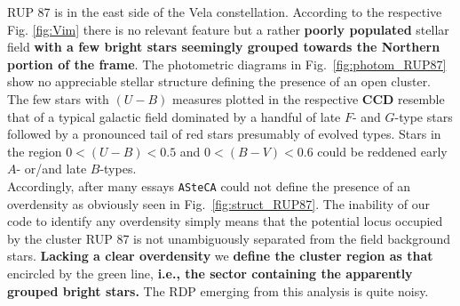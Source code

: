 \documentclass[referee]{aa}
\begin{document}
RUP 87 is in the east side of the Vela constellation. According to the
respective Fig. \ref{fig:Vim} there is no relevant feature but a rather
\textbf{poorly populated} stellar field \textbf{with a few bright stars
seemingly grouped  towards the Northern portion of the frame}.
The photometric diagrams in Fig.~\ref{fig:photom_RUP87} show no appreciable
stellar structure defining the presence of an open cluster.
The few stars with $(U-B)$ measures plotted in the respective \textbf{CCD}
resemble that of a typical galactic field dominated by a handful of late $F$-
and $G$-type stars followed by a pronounced tail of red stars presumably of
evolved types. Stars in the region $0<(U-B)<0.5$ and $0<(B-V)<0.6$ could be
reddened early $A$- or/and late $B$-types.\\

Accordingly, after many essays \texttt{ASteCA} could not define the presence of
an overdensity as obviously seen in Fig.~\ref{fig:struct_RUP87}.
The inability of our code to identify any overdensity simply means that the
potential locus occupied by the cluster RUP 87 is not unambiguously separated
from the field background stars.
\textbf{Lacking a clear overdensity} we \textbf{define the
cluster region as that} encircled by the green line, \textbf{i.e., the
sector containing the apparently grouped bright stars.} The RDP emerging from
this analysis is quite noisy.
\end{document}
